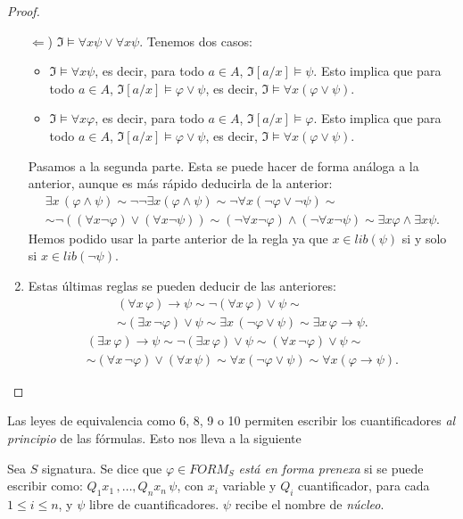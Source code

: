 \begin{proof}
\begin{enumerate}
\begin{itemize}
    \end{itemize}
    $\Longleftarrow$) $\mathfrak{I}\vDash\forall x \psi\lor\forall x \psi$. Tenemos dos casos:
    \begin{itemize}
        \item $\mathfrak{I}\vDash\forall x \psi$, es decir, para todo $a\in A$, $\mathfrak{I}[a/x]\vDash\psi$. Esto implica que para todo $a\in A$, $\mathfrak{I}[a/x]\vDash\varphi\lor\psi$, es decir, $\mathfrak{I}\vDash\forall x (\varphi\lor\psi)$.
        \item $\mathfrak{I}\vDash\forall x \varphi$, es decir, para todo $a\in A$, $\mathfrak{I}[a/x]\vDash\varphi$. Esto implica que para todo $a\in A$, $\mathfrak{I}[a/x]\vDash\varphi\lor\psi$, es decir, $\mathfrak{I}\vDash\forall x (\varphi\lor\psi)$.
    \end{itemize}
    Pasamos a la segunda parte. Esta se puede hacer de forma análoga a la anterior, aunque es más rápido deducirla de la anterior:
    \begin{multline*}
        \exists x\,(\varphi\land\psi)\sim\neg\neg\exists x(\varphi\land\psi)\sim\neg\forall x (\neg\varphi\lor\neg\psi)\sim\\\sim\neg((\forall x \neg \varphi)\lor(\forall x \neg\psi))\sim(\neg\forall x\neg\varphi)\land(\neg\forall x\neg\psi)\sim\exists x\varphi\land\exists x\psi.
    \end{multline*}
    Hemos podido usar la parte anterior de la regla ya que $x\in lib(\psi)$ si y solo si $x\in lib(\neg\psi)$.
    \item Estas últimas reglas se pueden deducir de las anteriores:
    \begin{multline*}
        (\forall x\,\varphi)\to\psi\sim\neg(\forall x\,\varphi)\lor\psi\sim\\\sim(\exists x\,\neg\varphi)\lor\psi\sim\exists x\,(\neg\varphi\lor\psi)\sim\exists x\,\varphi\to\psi.
    \end{multline*}
    \begin{multline*}
        (\exists x\,\varphi)\to\psi\sim\neg(\exists x\,\varphi)\lor\psi\sim(\forall x\,\neg\varphi)\lor\psi\sim\\\sim(\forall x\,\neg\varphi)\lor(\forall x\,\psi)\sim\forall x (\neg\varphi\lor\psi)\sim\forall x(\varphi\to\psi).
    \end{multline*}
\end{enumerate}
\end{proof}

Las leyes de equivalencia como 6, 8, 9 o 10 permiten escribir los cuantificadores \textit{al principio} de las fórmulas. Esto nos lleva a la siguiente
\begin{definition}
Sea $S$ signatura. Se dice que $\varphi \in FORM_S$ \textit{está en forma prenexa} si se puede escribir como:
$Q_1 x_1 \,, \dots, Q_n x_n \, \psi$, con $x_i$ variable y $Q_i$ cuantificador, para cada $1 \leq i \leq n$, y $\psi$ libre de cuantificadores. $\psi$ recibe el nombre de \textit{núcleo}.
\end{definition}

